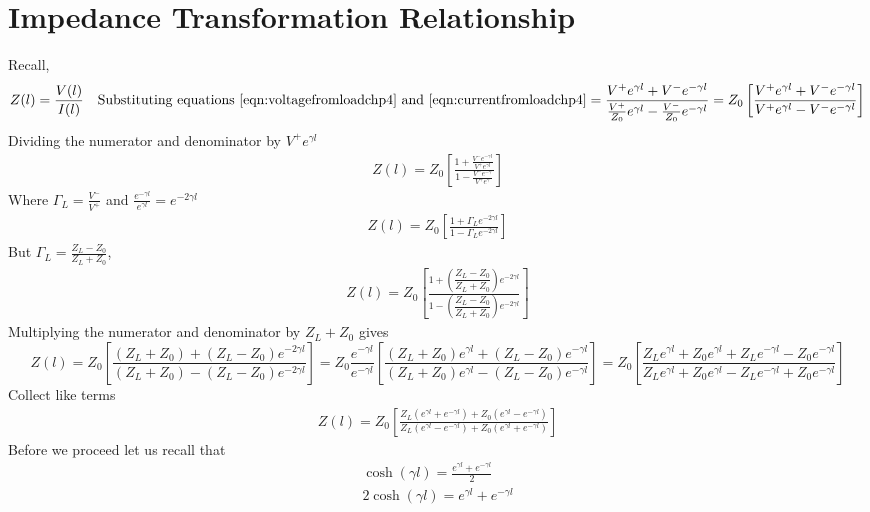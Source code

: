 \section{Impedance Transformation Relationship}
Recall,
\begin{dmath*}
Z(l) = \frac{V(l)}{I(l)}\quad\text{Substituting equations~\eqref{eqn:voltagefromloadchp4} and~\eqref{eqn:currentfromloadchp4}}
= \frac{V^+e^{\gamma l} + V^-e^{-\gamma l}}{\frac{V^+}{Z_0}e^{\gamma l} - \frac{V^-}{Z_0}e^{-\gamma l}}
= Z_0\left[\frac{V^+e^{\gamma l} + V^-e^{-\gamma l}}{V^+e^{\gamma l} - V^-e^{-\gamma l}}\right]
\end{dmath*}
Dividing the numerator and denominator by $V^+e^{\gamma l}$ 
\begin{align*}
Z(l) = Z_0\left[\frac{1 + \frac{V^-e^{-\gamma l}}{V^+e^{\gamma l}}}{1 - \frac{V^-e^{-\gamma }}{V^+e^{\gamma }}}\right]
\end{align*}
Where $\Gamma_L = \frac{V^-}{V^+}$ and $\frac{e^{-\gamma l}}{e^{\gamma l}} = e^{-2\gamma l}$
\begin{align}
Z(l)= Z_0\left[\frac{1 + \Gamma_L e^{-2\gamma l}}{1 - \Gamma_L e^{-2\gamma l}}\right]
\end{align}
But $\Gamma_L
= \frac{Z_L - Z_0}{Z_L + Z_0}$,
\begin{align*}
Z(l) = Z_0 \left[\frac{1 + \left(\dfrac{Z_L - Z_0}{Z_L + Z_0}\right)e^{-2\gamma l}}{1 - \left(\dfrac{Z_L - Z_0}{Z_L + Z_0}\right)e^{-2\gamma l}}\right]
\end{align*}
Multiplying the numerator and denominator by $Z_L + Z_0 $ gives
\begin{dmath*}
Z(l) = Z_0 \left[\frac{(Z_L + Z_0) + (Z_L - Z_0)e^{-2\gamma l}}{(Z_L + Z_0) - (Z_L - Z_0)e^{-2\gamma l}}\right]
= Z_0 \frac{e^{-\gamma l}}{e^{-\gamma l}}\left[\frac{(Z_L + Z_0)e^{\gamma l} + (Z_L - Z_0)e^{-\gamma l}}{(Z_L + Z_0)e^{\gamma l} - (Z_L - Z_0)e^{-\gamma l}}\right]
= Z_0 \left[\frac{Z_L e^{\gamma l} + Z_0e^{\gamma l} + Z_L e^{-\gamma l} - Z_0e^{-\gamma l}}{Z_L e^{\gamma l} + Z_0e^{\gamma l} - Z_L e^{-\gamma l} + Z_0e^{-\gamma l}}\right]
\end{dmath*}
Collect like terms
\begin{align*}
Z(l) = Z_0 \left[\frac{Z_L(e^{\gamma l} + e^{-\gamma l}) + Z_0(e^{\gamma l} - e^{-\gamma l})}{Z_L (e^{\gamma l} - e^{-\gamma l}) + Z_0(e^{\gamma l} + e^{-\gamma l})}\right]
\end{align*}
Before we proceed let us recall that 
\begin{align*}
\cosh(\gamma l) = \frac{e^{\gamma l} + e^{-\gamma l}}{2}\\
2\cosh(\gamma l) = e^{\gamma l} + e^{-\gamma l}
\end{align*}
